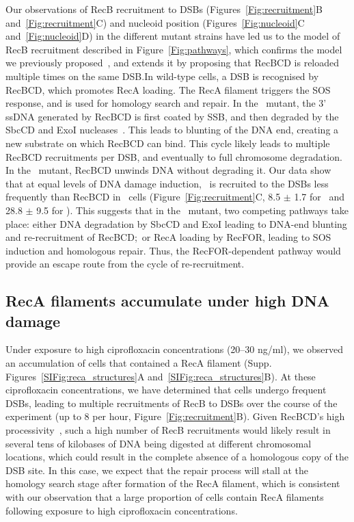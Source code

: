 Our observations of RecB recruitment to DSBs (Figures~\ref{Fig:recruitment}B and~\ref{Fig:recruitment}C) and nucleoid position (Figures~\ref{Fig:nucleoid}C and~\ref{Fig:nucleoid}D) in the different mutant strains have led us to the model of RecB recruitment described in Figure~\ref{Fig:pathways}, which confirms the model we previously proposed~\cite{Lepore2025}, and extends it by proposing that RecBCD is reloaded multiple times on the same DSB.\@ In wild-type cells, a DSB is recognised by RecBCD, which promotes RecA loading. The RecA filament triggers the SOS response, and is used for homology search and repair. In the \dreca\ mutant, the 3' ssDNA generated by RecBCD is first coated by SSB, and then degraded by the SbcCD and ExoI nucleases~\cite{Zahradka2009}. This leads to blunting of the DNA end, creating a new substrate on which RecBCD can bind. This cycle likely leads to multiple RecBCD recruitments per DSB, and eventually to full chromosome degradation. In the \geneteneighty\ mutant, RecBCD unwinds DNA without degrading it. Our data show that at equal levels of DNA damage induction, \teneighty\ is recruited to the DSBs less frequently than RecBCD in \dreca\ cells (Figure~\ref{Fig:recruitment}C, 8.5 $\pm$ 1.7 for \teneighty\ and 28.8 $\pm$ 9.5 for \dreca). This suggests that in the \geneteneighty\ mutant, two competing pathways take place: either DNA degradation by SbcCD and ExoI leading to DNA-end blunting and re-recruitment of RecBCD;\ or RecA loading by RecFOR, leading to SOS induction and homologous repair. Thus, the RecFOR-dependent pathway would provide an escape route from the cycle of re-recruitment.

\subsection*{RecA filaments accumulate under high DNA damage}
Under exposure to high ciprofloxacin concentrations (20--30 ng/ml), we observed an accumulation of cells that contained a RecA filament (Supp. Figures~\ref{SIFig:reca_structures}A and~\ref{SIFig:reca_structures}B). At these ciprofloxacin concentrations, we have determined that cells undergo frequent DSBs, leading to multiple recruitments of RecB to DSBs over the course of the experiment (up to 8 per hour, Figure~\ref{Fig:recruitment}B). Given RecBCD's high processivity~\cite{Wiktor2018}, such a high number of RecB recruitments would likely result in several tens of kilobases of DNA being digested at different chromosomal locations, which could result in the complete absence of a homologous copy of the DSB site. In this case, we expect that the repair process will stall at the homology search stage after formation of the RecA filament, which is consistent with our observation that a large proportion of cells contain RecA filaments following exposure to high ciprofloxacin concentrations.

